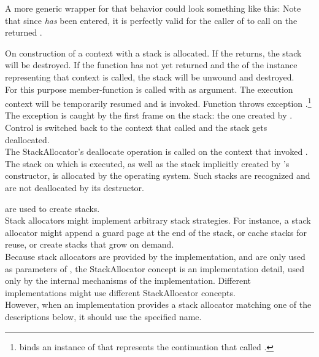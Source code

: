 A more generic wrapper for that behavior could look something like this:
Note that since  \emph{has} been entered, it
is perfectly valid for the caller of  to
call \resumewith on the returned \cont.

\label{subsec:destruction}
On construction of a context with \callcc a stack is allocated. If the
\entryfn returns, the stack will be destroyed. If the function has not
yet returned and the  of the \cont instance
representing that context is called, the stack will be unwound and destroyed.\\

For this purpose member-function \resumewith is called with \unwindcont
as argument. The execution context will be temporarily
resumed and \unwindcont is invoked. Function \unwindcont throws exception
\unwindex.\footnote{\unwindex binds an instance of \cont that represents the
continuation that called \resumewith.} The exception
is caught by the first frame on the stack: the one created by
\callcc. Control is switched back to the context that called
\dtor and the stack gets deallocated.\\

The StackAllocator's deallocate operation is called on the context that
invoked \dtor.\\

The stack on which  is executed, as well as the stack implicitly
created by 's constructor, is allocated by the operating
system. Such stacks are recognized and are not deallocated by its destructor.


\label{subsec:stackalloc}
are used to create stacks.\\

Stack allocators might implement arbitrary stack strategies. For instance, a
stack allocator might append a guard page at the end of the stack, or cache
stacks for reuse, or create stacks that grow on demand.\\

Because stack allocators are provided by the implementation, and are only used
as parameters of \callcc, the StackAllocator concept is an implementation detail,
used only by the internal mechanisms of the \cc implementation. Different
implementations might use different StackAllocator concepts.\\

However, when an implementation provides a stack allocator matching one of
the descriptions below, it should use the specified name.\\

